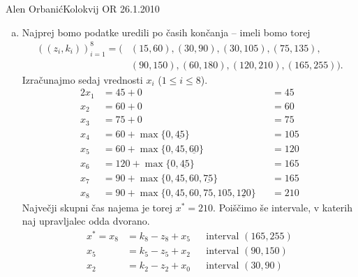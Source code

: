 \begin{naloga}{Alen Orbanić}{Kolokvij OR 26.1.2010}
\begin{odgovor}
\begin{enumerate}[(a)]
\item Najprej bomo podatke uredili po časih končanja
-- imeli bomo torej
\begin{align*}
((z_i, k_i))_{i=1}^8 = (&{} (15, 60), (30, 90), (30, 105), (75, 135), \\
&{} (90, 150), (60, 180), (120, 210), (165, 255)) .
\end{align*}
Izračunajmo sedaj vrednosti $x_i$ ($1 \le i \le 8$).
\begin{alignat*}{2}
x_1 &= 45 + 0 &&= 45 \\
x_2 &= 60 + 0 &&= 60 \\
x_3 &= 75 + 0 &&= 75 \\
x_4 &= 60 + \max\{0, \underline{45}\} &&= 105 \\
x_5 &= 60 + \max\{0, 45, \underline{60}\} &&= 120 \\
x_6 &= 120 + \max\{0, \underline{45}\} &&= 165 \\
x_7 &= 90 + \max\{0, 45, 60, \underline{75}\} &&= 165 \\
x_8 &= 90 + \max\{0, 45, 60, 75, 105, \underline{120}\} &&= 210
\end{alignat*}
Največji skupni čas najema je torej $x^* = 210$.
Poiščimo še intervale, v katerih naj upravljalec odda dvorano.
\begin{align*}
x^* = x_8 &= k_8-z_8 + x_5 && \text{interval $(165, 255)$} \\
	  x_5 &= k_5-z_5 + x_2 && \text{interval $(90, 150)$} \\
	  x_2 &= k_2-z_2 + x_0 && \text{interval $(30, 90)$} \\
\end{align*}
\end{enumerate}
\end{odgovor}
\end{naloga}
